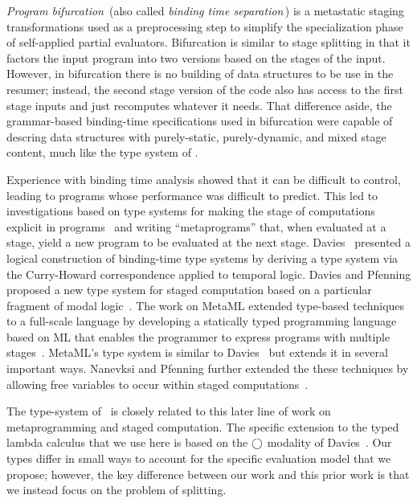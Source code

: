 \emph{Program bifurcation}\,\cite{DeNiel91} (also called \emph{binding time separation}\,\cite{Mogensen89a})
is a metastatic staging transformations
used as a preprocessing step to simplify the specialization phase of self-applied partial evaluators. 
Bifurcation is similar to stage splitting in that it factors the input program
into two versions based on the stages of the input.
However, in bifurcation there is no building of data structures to be use in the resumer;
instead, the second stage version of the code also has 
access to the first stage inputs and just recomputes whatever it needs.
That difference aside, the grammar-based binding-time specifications used in bifurcation
were capable of descring data structures with purely-static, purely-dynamic, and mixed stage content,
much like the type system of \lang.

Experience with binding time analysis showed that it can be difficult
to control, leading to programs whose performance was difficult to
predict. This led to investigations based on type systems for making
the stage of computations explicit in
programs~\cite{GJ91-lambda,NN92-twolevel} and writing ``metaprograms''
that, when evaluated at a stage, yield a new program to be evaluated
at the next stage.
Davies~\cite{davies96} presented a
logical construction of binding-time type systems by deriving a type
system via the Curry-Howard correspondence applied to temporal logic.
Davies and Pfenning proposed a new type system for staged computation
based on a particular fragment of modal logic~\cite{DP01-modal}. The
work on MetaML extended type-based techniques to a full-scale language
by developing a statically typed programming language based on ML that
enables the programmer to express programs with multiple
stages~\cite{Taha97,taha-thesis-99}.  MetaML's type system is similar
to Davies~\cite{davies96} but extends it in several important ways.
Nanevksi and Pfenning further extended the these techniques by
allowing free variables to occur within staged
computations~\cite{NP05-nn}.

The type-system of \lang\ is closely related to this later line of
work on metaprogramming and staged computation.  The specific
extension to the typed lambda calculus that we use here is based on
the $\bigcirc$ modality of Davies~\cite{DP01-modal}.  Our types differ in
small ways to account for the specific evaluation model that we
propose; however, the key difference between our work and this prior
work is that we instead focus on the problem of splitting.

